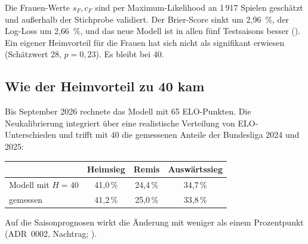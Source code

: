 Die Frauen-Werte $s_F, c_F$ sind per Maximum-Likelihood an 1\,917 Spielen
geschätzt und außerhalb der Stichprobe validiert. Der Brier-Score sinkt um
2{,}96~\%, der Log-Loss um 2{,}66~\%, und das neue Modell ist in allen fünf
Testsaisons besser
(). Ein eigener
Heimvorteil für die Frauen hat sich nicht als signifikant erwiesen
(Schätzwert 28, $p = 0{,}23$). Es bleibt bei 40.

\subsection*{Wie der Heimvorteil zu 40 kam}

Bis September 2026 rechnete das Modell mit 65 ELO-Punkten. Die
Neukalibrierung integriert über eine realistische Verteilung von
ELO-Unterschieden und trifft mit 40 die gemessenen Anteile der Bundesliga
2024 und 2025:

\begin{center}
\begin{tabular}{@{}lccc@{}}
\toprule
& Heimsieg & Remis & Auswärtssieg \\
\midrule
Modell mit $H = 40$ & 41{,}0\,\% & 24{,}4\,\% & 34{,}7\,\% \\
gemessen            & 41{,}2\,\% & 25{,}0\,\% & 33{,}8\,\% \\
\bottomrule
\end{tabular}
\end{center}

Auf die Saisonprognosen wirkt die Änderung mit weniger als einem
Prozentpunkt (ADR~0002, Nachtrag;
).
